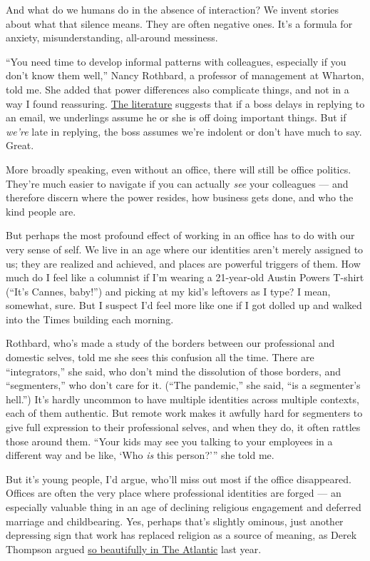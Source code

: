 And what do we humans do in the absence of interaction? We invent
stories about what that silence means. They are often negative ones.
It's a formula for anxiety, misunderstanding, all-around messiness.

``You need time to develop informal patterns with colleagues, especially
if you don't know them well,'' Nancy Rothbard, a professor of management
at Wharton, told me. She added that power differences also complicate
things, and not in a way I found reassuring.
\href{https://www.ncbi.nlm.nih.gov/pubmed/17100492}{The literature}
suggests that if a boss delays in replying to an email, we underlings
assume he or she is off doing important things. But if \emph{we're} late
in replying, the boss assumes we're indolent or don't have much to say.
Great.

More broadly speaking, even without an office, there will still be
office politics. They're much easier to navigate if you can actually
\emph{see} your colleagues --- and therefore discern where the power
resides, how business gets done, and who the kind people are.

But perhaps the most profound effect of working in an office has to do
with our very sense of self. We live in an age where our identities
aren't merely assigned to us; they are realized and achieved, and places
are powerful triggers of them. How much do I feel like a columnist if
I'm wearing a 21-year-old Austin Powers T-shirt (``It's Cannes, baby!'')
and picking at my kid's leftovers as I type? I mean, somewhat, sure. But
I suspect I'd feel more like one if I got dolled up and walked into the
Times building each morning.

Rothbard, who's made a study of the borders between our professional and
domestic selves, told me she sees this confusion all the time. There are
``integrators,'' she said, who don't mind the dissolution of those
borders, and ``segmenters,'' who don't care for it. (``The pandemic,''
she said, ``is a segmenter's hell.'') It's hardly uncommon to have
multiple identities across multiple contexts, each of them authentic.
But remote work makes it awfully hard for segmenters to give full
expression to their professional selves, and when they do, it often
rattles those around them. ``Your kids may see you talking to your
employees in a different way and be like, `Who \emph{is} this person?'''
she told me.

But it's young people, I'd argue, who'll miss out most if the office
disappeared. Offices are often the very place where professional
identities are forged --- an especially valuable thing in an age of
declining religious engagement and deferred marriage and childbearing.
Yes, perhaps that's slightly ominous, just another depressing sign that
work has replaced religion as a source of meaning, as Derek Thompson
argued
\href{https://www.theatlantic.com/ideas/archive/2019/02/religion-workism-making-americans-miserable/583441/}{so
beautifully in The Atlantic} last year.

